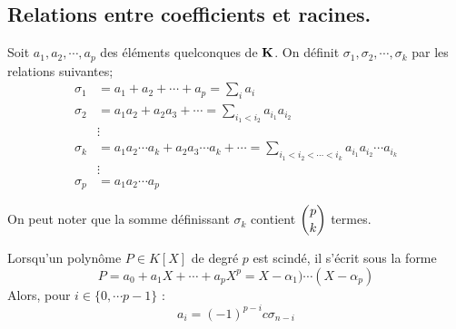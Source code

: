 \subsection{Relations entre coefficients et racines.}
\begin{defi}
 Soit $a_1,a_2,\cdots,a_p$ des éléments quelconques de $\mathbf{K}$. On définit $\sigma_1, \sigma_2, \cdots ,\sigma_k$ par les relations suivantes;
\begin{align*}
 \sigma_1 &= a_1+a_2+\cdots +a_p  = \sum_{i}a_i\\
\sigma_2 &= a_1a_2+a_2a_3+\cdots   = \sum_{i_1<i_2}a_{i_1}a_{i_2} \\
 &\vdots \\
\sigma_k &= a_1a_2\cdots a_k+a_2a_3\cdots a_k+\cdots   = \sum_{i_1<i_2<\cdots <i_k}a_{i_1}a_{i_2}\cdots a_{i_k} \\
 &\vdots \\
\sigma_p &= a_1a_2\cdots a_p
\end{align*}
\end{defi}
\begin{rem}
 On peut noter que la somme définissant $\sigma_k$ contient $\dbinom{p}{k}$ termes.
\end{rem}
\begin{prop}
 Lorsqu'un polynôme $P\in K[X]$ de degré $p$ est scindé, il s'écrit sous la forme
\begin{displaymath}
 P = a_0+a_1X +\cdots +a_pX^p = X-\alpha_1)\cdots (X-\alpha_p)
\end{displaymath}
 Alors, pour $i\in\{0,\cdots p-1\}$ :
\begin{displaymath}
 a_i = (-1)^{p-i}c \sigma_{n-i}
\end{displaymath}
\end{prop}



